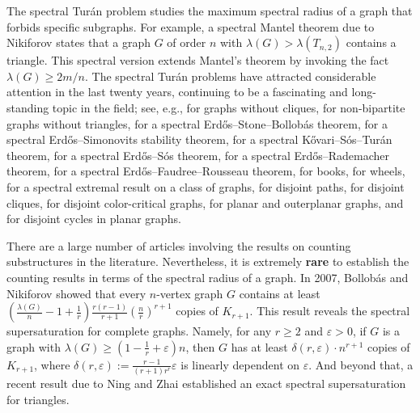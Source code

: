 \documentclass[11pt]{article}
\begin{document}
\medskip 
The spectral Tur\'{a}n problem 
studies the maximum spectral radius of 
a graph that forbids specific subgraphs.  
For example, a spectral Mantel theorem due to Nikiforov \cite{Niki2007laa2} states that 
a graph $G$ of order $n$ with $\lambda (G)> \lambda (T_{n,2})$ contains a triangle. 
This spectral version extends Mantel's theorem  
by invoking the fact  $\lambda (G) \ge 2m/n$. 
The spectral Tur\'{a}n problems have attracted considerable attention in the last twenty years, continuing to be a fascinating and long-standing topic in the field; see, e.g., 
\cite{Wil1986,Niki2002cpc,Niki2007laa2,LP2022second,ZhangST2024} for graphs without cliques, 
\cite{LNW2021,ZS2022dm,LFP2023-solution,LLH2022} for non-bipartite graphs without triangles,  
\cite{Niki2009cpc} for a spectral Erd\H{o}s--Stone--Bollob\'{a}s theorem,  
\cite{Niki2009jgt} for a spectral Erd\H{o}s--Simonovits stability theorem, 
\cite{BG2009,Niki2010laa} for a spectral  K\H{o}vari--S\'{o}s--Tur\'{a}n theorem, 
\cite{CDT2023} for a spectral Erd\H{o}s--S\'{o}s theorem, 
\cite{LLP2024-AAM} for a spectral Erd\H{o}s--Rademacher theorem, 
\cite{LFP2024-triangular} for a spectral Erd\H{o}s--Faudree--Rousseau theorem, 
\cite{Niki2021,ZL2022jgt} for books, 
\cite{CDT21,ZHL2021} for wheels, 
\cite{Wang2022} for a spectral extremal result on a class of graphs, 
\cite{CLZ2019-GC} for disjoint paths, 
\cite{NWK2023} for disjoint cliques, 
 \cite{LL2024} for 
disjoint color-critical graphs, 
\cite{TT2017,LN2021outplanar} for planar and outerplanar graphs, and 
\cite{FLS2024, ZL2024} for disjoint cycles in planar graphs.  







\medskip 
There are a large number of 
articles involving the results on counting substructures in the literature.  
Nevertheless, it is extremely \textbf{rare} to establish the counting results 
in terms of the spectral radius of a graph. 
In 2007, Bollob\'{a}s and Nikiforov \cite{BN2007jctb}  showed that every $n$-vertex graph $G$ contains 
at least $  (\frac{\lambda (G)}{n} -1 + \frac{1}{r}) 
\frac{r(r-1)}{r+1}(\frac{n}{r})^{r+1} $ copies of $K_{r+1}$. 
This result reveals the spectral supersaturation for complete graphs. 
Namely, for any $r\ge 2$ and $\varepsilon>0$, if  $G$ is a graph with 
$\lambda (G) \ge (1-\frac{1}{r} + \varepsilon)n$, then $G$ has at least $\delta (r,\varepsilon)\cdot n^{r+1}$ copies of $K_{r+1}$, 
where $\delta (r,\varepsilon):=\frac{r-1}{(r+1)r^r} \varepsilon$ 
is linearly dependent on $\varepsilon$. 
And beyond that, 
a recent result due to
 Ning and Zhai \cite{NZ2021} 
established an exact spectral supersaturation 
for triangles. 
\end{document}
